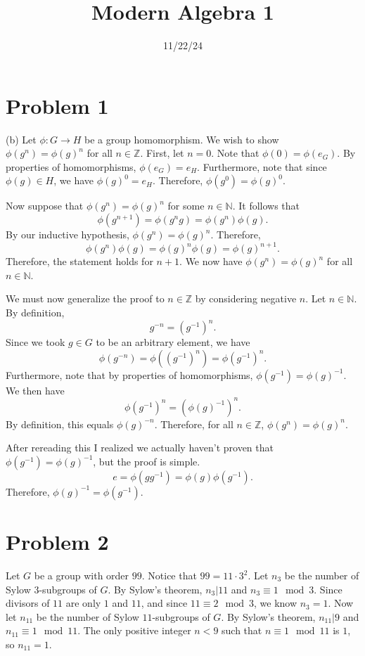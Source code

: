 \documentclass[11pt, letterpaper]{report}
\title{Modern Algebra 1}
\date{11/22/24}
\begin{document}
\makeproblem
\section*{Problem 1}
(b) Let $\phi : G \to H$ be a group homomorphism. We wish to show $\phi (g^n)=\phi (g)^n$ for all $n\in\mathbb{Z}$. First, let $n=0$. Note that $\phi(0)=\phi(e_G)$. By properties of homomorphisms, $\phi (e_G)=e_H$. Furthermore, note that since $\phi(g)\in H$, we have $\phi (g)^0=e_H$. Therefore, $\phi (g^0)=\phi (g)^0$.

Now suppose that $\phi(g^n)=\phi(g)^n$ for some $n\in\mathbb{N}$. It follows that
\[
	\phi (g^{n+1})=\phi (g^ng)=\phi (g^n)\phi(g)
.\]
By our inductive hypothesis, $\phi (g^n)=\phi (g)^n$. Therefore,
\[
	\phi (g^n)\phi (g)=\phi (g)^n\phi (g)=\phi (g)^{n+1}
.\]
Therefore, the statement holds for $n+1$. We now have $\phi (g^n)=\phi (g)^n$ for all $n\in\mathbb{N}$.

We must now generalize the proof to $n\in\mathbb{Z}$ by considering negative $n$. Let $n\in\mathbb{N}$. By definition,
\[
	g^{-n}=\left( g^{-1} \right) ^n
.\]
Since we took $g\in G$ to be an arbitrary element, we have
\[
	\phi (g^{-n})=\phi \left( (g^{-1})^n \right) =\phi \left( g^{-1} \right) ^n
.\]
Furthermore, note that by properties of homomorphisms, $\phi (g^{-1})=\phi (g)^{-1}$. We then have
\[
	\phi \left( g^{-1} \right) ^n=\left( \phi (g)^{-1} \right) ^n
.\]
By definition, this equals $\phi (g)^{-n}$. Therefore, for all $n\in\mathbb{Z}$, $\phi (g^n)=\phi (g)^n$.


After rereading this I realized we actually haven't proven that $\phi (g^{-1})=\phi (g)^{-1}$, but the proof is simple.
\[
	e=\phi (gg^{-1})=\phi (g)\phi (g^{-1})
.\]
Therefore, $\phi (g)^{-1}=\phi (g^{-1})$.
\section*{Problem 2}
Let $G$ be a group with order $99$. Notice that $99=11\cdot 3^2$. Let $n_3$ be the number of Sylow $3$-subgroups of $G$. By Sylow's theorem, $n_3|11$ and $n_3\equiv 1\mod{3}$. Since divisors of $11$ are only $1$ and $11$, and since $11\equiv 2\mod{3}$, we know $n_3=1$. Now let $n_{11}$ be the number of Sylow $11$-subgroups of $G$. By Sylow's theorem, $n_{11}|9$ and $n_{11}\equiv 1\mod{11}$. The only positive integer $n<9$ such that $n\equiv 1\mod{11}$ is $1$, so $n_{11}=1$.
\end{document}
